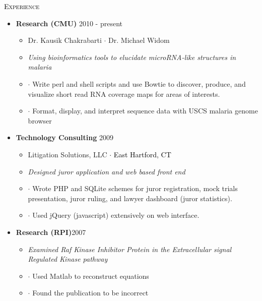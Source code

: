 \documentclass[letterpaper]{article}
\def\firstWidth{.10\textwidth}
\def\secondWidth{.90\textwidth}
\begin{document}
\begin{minipage}{\firstWidth}
\large \textcolor{Black}{\textsc{Experience}}
\end{minipage}
\begin{minipage}{\secondWidth}
\begin{itemize}
\item{\textbf{Research (CMU)} \hfill 2010 - present} 
	\begin{itemize}
	\item{Dr. Kausik Chakrabarti $\cdot$ Dr. Michael Widom}
	\item {\em Using bioinformatics tools to elucidate microRNA-like structures in malaria}
	\item $\cdot$ Write perl and shell scripts and use Bowtie to discover, produce, and visualize short read RNA coverage maps for areas of interests.  
	\item $\cdot$ Format, display, and interpret sequence data with USCS malaria genome browser
	\end{itemize}
\item{\textbf{Technology Consulting} \hfill 2009}
	\begin{itemize}
	\item{Litigation Solutions, LLC \textcolor{Black}{$\cdot$ East Hartford, CT}}
	\item{\em Designed juror application and web based front end}
	\item $\cdot$ Wrote PHP and SQLite schemes for juror registration, mock trials presentation, juror ruling, and lawyer dashboard (juror statistics).  
	\item $\cdot$ Used jQuery (javascript) extensively on web interface.
	\end{itemize}
\item{\textbf{Research (RPI)}\hfill 2007}
	\begin{itemize}
	\item{\em Examined Raf Kinase Inhibitor Protein in the Extracellular signal Regulated Kinase  pathway}
	\item $\cdot$ Used Matlab to reconstruct equations
	\item $\cdot$ Found the publication to be incorrect
	\end{itemize}
\end{itemize}
\end{minipage}
\end{document}
